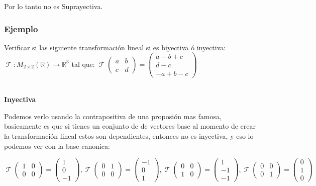 \documentclass[12pt]{report}                                    %
\DeclareMathOperator \LinealTransformation {\mathcal{T}}
\begin{document}
            Por lo tanto no es Suprayectiva.


            \clearpage
            \subsubsection{Ejemplo}
            Verificar si las siguiente transformación lineal si es biyectiva ó inyectiva:
            $\LinealTransformation : M_{2 \times 2}(\mathbb{R}) \to \mathbb{R}^3$ tal que: 
            $\LinealTransformation(\begin{matrix}a&b\\c&d\end{matrix}) = \begin{pmatrix}a-b+c\\d-c\\-a+b-c\end{pmatrix}$

            \textbf{\\Inyectiva}

            Podemos verlo usando la contrapositiva de una proposión mas famosa, basicamente es que si
            tienes un conjunto de de vectores base al momento de crear la transformación lineal estos son dependientes, 
            entonces no es inyectiva, y eso lo podemos ver con la base canonica:

            \begin{equation*}
                \LinealTransformation(\begin{matrix}1&0\\0&0\end{matrix}) = \begin{pmatrix}1\\0\\-1\end{pmatrix}, 
                \LinealTransformation(\begin{matrix}0&1\\0&0\end{matrix}) = \begin{pmatrix}-1\\0\\1\end{pmatrix}, 
                \LinealTransformation(\begin{matrix}0&0\\1&0\end{matrix}) = \begin{pmatrix}1\\-1\\-1\end{pmatrix}, 
                \LinealTransformation(\begin{matrix}0&0\\0&1\end{matrix}) = \begin{pmatrix}0\\1\\0\end{pmatrix} 
            \end{equation*}
\end{document}
